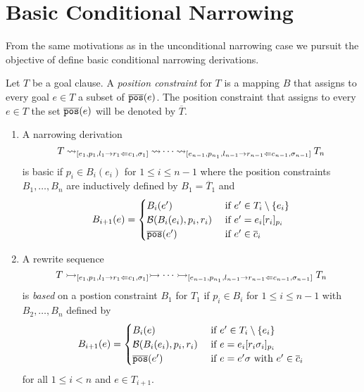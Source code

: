 \section{Basic Conditional Narrowing}
From the same motivations as in the unconditional narrowing case we pursuit the objective of define basic conditional narrowing derivations.

\begin{definition}
    Let $T$ be a goal clause. A \textit{position constraint} for $T$ is a mapping $B$ that assigns to every goal $e \in T$ a subset of $\overline{\mathtt{pos}}(e)$. The position constraint that assigns to every $e \in T$ the set $\overline{\mathtt{pos}}(e)$ will be denoted by $\overline{T}$.
\end{definition}

\begin{definition}
    \begin{enumerate}
        \item A narrowing derivation
        $$T \mathbin{\rightsquigarrow}_{[e_1, p_1, l_1 \rightarrow r_1 \Leftarrow c_1, \sigma_1]} \mathbin{\rightsquigarrow} \cdots \mathbin{\rightsquigarrow}_{[e_{n-1}, p_{n_1}, l_{n-1} \rightarrow r_{n-1} \Leftarrow c_{n-1}, \sigma_{n-1}]} T_n$$
        is basic if $p_i \in B_i(e_i)$ for $1 \leq i \leq n - 1$ where the position constraints $B_1, \dots, B_n$ are inductively defined by $B_1 = \overline{T}_1$ and
        \begin{displaymath}
            B_{i+1}(e) =
            \begin{cases}
                B_i(e') & \text{ if } e' \in T_i \setminus \{e_i\} \\
                \mathcal{B}(B_i(e_i), p_i, r_i) & \text{ if } e' = e_i[r_i]_{p_i} \\
                \overline{\mathtt{pos}}(e') & \text{ if } e' \in \overline{c}_i
            \end{cases}
        \end{displaymath}
        \item A rewrite sequence
        $$T \rightarrowtail_{[e_1, p_1, l_1 \rightarrow r_1 \Leftarrow c_1, \sigma_1]} \rightarrowtail \cdots \rightarrowtail_{[e_{n-1}, p_{n_1}, l_{n-1} \rightarrow r_{n-1} \Leftarrow c_{n-1}, \sigma_{n-1}]} T_n$$
        is \textit{based} on a postion constraint $B_1$ for $T_1$ if $p_i \in B_i$ for $1 \leq i \leq n - 1$ with $B_2, \dots, B_n$ defined by
        \begin{displaymath}
            B_{i+1}(e) =
            \begin{cases}
                B_i(e) & \text{ if } e' \in T_i \setminus \{e_i\} \\
                \mathcal{B}(B_i(e_i), p_i, r_i) & \text{ if } e = e_i[r_i\sigma_i]_{p_i} \\
                \overline{\mathtt{pos}}(e') & \text{ if } e=e'\sigma \text{ with } e' \in \overline{c}_i
            \end{cases}
        \end{displaymath}
        for all $1 \leq i < n$ and $e \in T_{i+1}$.
    \end{enumerate}
\end{definition}

